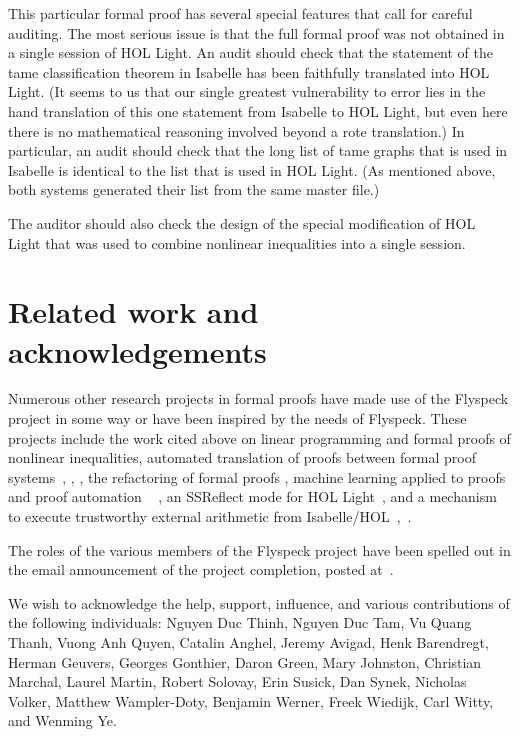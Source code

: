 This particular formal proof has several special features that call
for careful auditing.  The most serious issue is that the full formal
proof was not obtained in a single session of HOL Light.  An audit
should check that the statement of the tame classification theorem in
Isabelle has been faithfully translated into HOL Light.  (It seems to
us that our single greatest vulnerability to error lies in the hand
translation of this one statement from Isabelle to HOL Light, but even
here there is no mathematical reasoning involved beyond a rote
translation.)  In particular, an audit should check that the long list
of tame graphs that is used in Isabelle is identical to the list that
is used in HOL Light.  (As mentioned above, both systems generated
their list from the same master file.)

The auditor should also check the
design of the special modification of HOL Light that was used to combine
nonlinear inequalities into a single session.



\section{Related work and acknowledgements}

Numerous other research projects in formal proofs have made use of
the Flyspeck project in some way or have been inspired by the needs of
Flyspeck.  These projects include the work cited above on linear programming
and formal proofs of nonlinear inequalities, automated translation of proofs
between formal proof systems~\cite{obua:import}, \cite{KaliszykK13}, 
\cite{McLaughlin:2006:IJCAR},
the refactoring of formal proofs \cite{adams2012recording}, machine learning
applied to proofs and proof automation ~\cite{KU14} \cite{KaliszykU2014}, an SSReflect mode for HOL Light~\cite{Solovyev-thesis}, and a mechanism to
execute trustworthy external arithmetic from
Isabelle/HOL~\cite{obua:phd},~\cite{ObuaN}.


The roles of the
various members of the Flyspeck project have been spelled out in the email
announcement of the project completion, posted
at~\cite{website:FlyspeckProject}. 

We wish to acknowledge the help, support, influence, and various
contributions of the following individuals:
Nguyen Duc Thinh,  
Nguyen Duc Tam, 
Vu Quang Thanh,
Vuong Anh Quyen,
% 
Catalin Anghel, 
Jeremy Avigad, 
Henk Barendregt,
%
Herman Geuvers,
Georges Gonthier,
Daron Green,
Mary Johnston,
Christian Marchal,
Laurel %
Martin, 
%
Robert Solovay,
Erin Susick,
Dan Synek,
Nicholas Volker, 
Matthew Wampler-Doty, 
Benjamin Werner,
Freek Wiedijk, 
Carl Witty, and
Wenming Ye.

